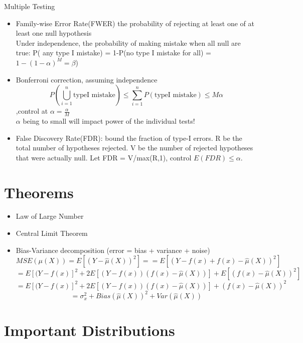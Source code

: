 \documentclass[11pt, openany]{book}              %
\begin{document}
Multiple Testing 

\begin{itemize}
    \item Family-wise Error Rate(FWER) the probability of rejecting at least one of at least one null hypothesis \\ 
    Under independence, the probability of making mistake when all null are true: P( any type I mistake) = 1-P(no type I mistake for all) = $1-(1-\alpha)^M=\beta$) \\
    \item Bonferroni correction, assuming independence 
    $$P(\bigcup_{i=1}^n \text{typeI mistake}) \leq \sum_{i=1}^n P(\text{typeI mistake}) \leq M\alpha$$,control at $\alpha=\frac{\alpha}{M}$ \\
    $\alpha$ being to small will impact power of the individual tests!
    \item False Discovery Rate(FDR): bound the fraction of type-I errors. R be the total number of hypotheses rejected. V be the number of rejected hypotheses that were actually null. Let FDR = V/max(R,1), control $E(FDR) \leq \alpha$.
\end{itemize}

\section{Theorems}
\begin{itemize}
    \item Law of Large Number
    \item Central Limit Theorem
     \item Bias-Variance decomposition (error = bias + variance + noise)
        $$MSE(\mu(X) ) = E[(Y-\hat{\mu}(X))^2]  = = E[(Y-f(x) + f(x) -\hat{\mu}(X))^2]$$
    $$= E[(Y-f(x)]^2 + 2E[(Y-f(x))(f(x) - \hat{\mu}(X))] + E[(f(x)-\hat{\mu}(X))^2]$$
     $$= E[(Y-f(x)]^2 + 2E[(Y-f(x))(f(x) - \hat{\mu}(X))] + (f(x)-\hat{\mu}(X))^2$$
    $$ =\sigma_x^2 + Bias(\hat{\mu}(X))^2 + Var(\hat{\mu}(X))$$
\end{itemize}

\section{Important Distributions}
\end{document}
